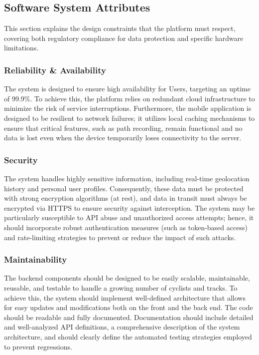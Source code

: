 \subsection{Software System Attributes}
This section explains the design constraints that the platform must respect, covering both regulatory compliance for data protection and specific hardware limitations.

\subsubsection{Reliability \& Availability}
The system is designed to ensure high availability for Users, targeting an uptime of 99.9\%. To achieve this, the platform relies on redundant cloud infrastructure to minimize the risk of service interruptions. Furthermore, the mobile application is designed to be resilient to network failures; it utilizes local caching mechanisms to ensure that critical features, such as path recording, remain functional and no data is lost even when the device temporarily loses connectivity to the server.

\subsubsection{Security}
The system handles highly sensitive information, including real-time geolocation history and personal user profiles. Consequently, these data must be protected with strong encryption algorithms (at rest), and data in transit must always be encrypted via HTTPS to ensure security against interception. The system may be particularly susceptible to API abuse and unauthorized access attempts; hence, it should incorporate robust authentication measures (such as token-based access) and rate-limiting strategies to prevent or reduce the impact of such attacks.

\subsubsection{Maintainability}
The backend components should be designed to be easily scalable, maintainable, reusable, and testable to handle a growing number of cyclists and tracks. To achieve this, the system should implement well-defined architecture that allows for easy updates and modifications both on the front and the back end. The code should be readable and fully documented. Documentation should include detailed and well-analyzed API definitions, a comprehensive description of the system architecture, and should clearly define the automated testing strategies employed to prevent regressions.

